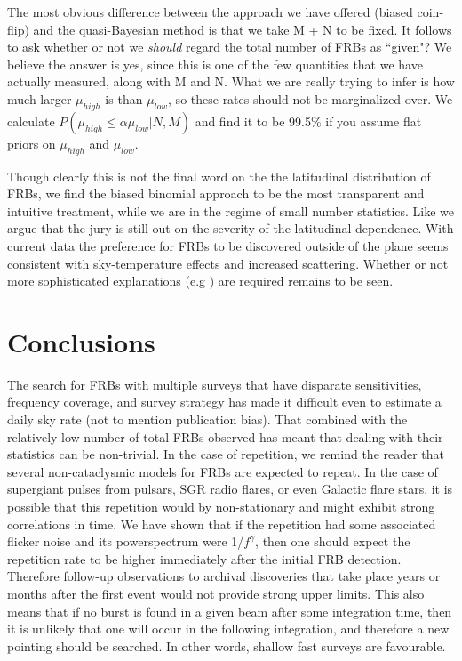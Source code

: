 \documentclass[useAMS,usenatbib]{mn2e}
\begin{document}
The most obvious difference between the approach we have offered (biased coin-flip) 
and the quasi-Bayesian method is that we take M + N to be fixed. It follows to ask 
whether or not we \textit{should} regard the total number of FRBs as ``given"? 
We believe the answer is yes, since this is one of the few quantities that we 
have actually measured, along with M and N. What we are really trying 
to infer is how much larger $\mu_{high}$ is than $\mu_{low}$, so these 
rates should not be marginalized over. We calculate $P(\mu_{high} \le \alpha \mu_{low} | N, M)$
and find it to be 99.5$\%$ if you assume flat priors on $\mu_{high}$ and $\mu_{low}$.

Though clearly this is not the final word on the the latitudinal distribution of FRBs, 
we find the biased binomial approach to be the 
most transparent and intuitive treatment, while we are in the regime of small number statistics. 
Like \cite{2015arXiv150500834R} we argue
that the jury is still out on the severity of the latitudinal 
dependence. With current data the preference for FRBs to 
be discovered outside of the plane seems consistent with
sky-temperature effects and increased scattering. 
Whether or not more sophisticated explanations 
(e.g \cite{2015MNRAS.451.3278M}) are required remains to be seen. 

\section{Conclusions}

The search for FRBs with multiple surveys that have disparate sensitivities, 
frequency coverage, and survey strategy has made it difficult even to 
estimate a daily sky rate (not to mention publication bias). 
That combined with the relatively low number of total FRBs observed 
has meant that dealing with their statistics can be non-trivial. In 
the case of repetition, we remind the reader that several non-cataclysmic 
models for FRBs are expected to repeat. In the case of supergiant 
pulses from pulsars, SGR radio flares, or even Galactic flare stars, it is possible 
that this repetition would by non-stationary and might exhibit strong correlations 
in time. We have shown that if the repetition had some associated flicker noise 
and its powerspectrum were 1/$f^\gamma$, then one should expect the repetition 
rate to be higher immediately after the initial FRB detection. Therefore follow-up 
observations to archival discoveries that take place years or 
months after the first event would not provide strong upper limits. 
This also means that if no burst is found in a given beam after some 
integration time, then it is unlikely that one will occur in the following integration, and therefore 
a new pointing should be searched. In other words, shallow fast surveys are favourable. 
\end{document}
